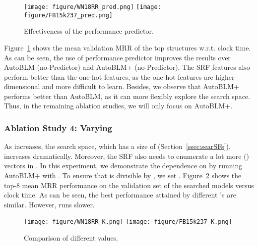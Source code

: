 \documentclass[10pt,journal,compsoc]{IEEEtran}
\begin{document}
\begin{figure}[ht]
	\centering
	\vspace{-5px}
	\texttt{[image: figure/WN18RR\_pred.png]}\hfill
	\texttt{[image: figure/FB15k237\_pred.png]}
	\vspace{-10px}
	\caption{Effectiveness of the performance predictor.}
	\vspace{-2px}
	\label{fig:predictor}
\end{figure}

Figure~\ref{fig:predictor} shows the mean validation MRR of the top 
structures w.r.t. clock time.
As can be seen,
the use of performance predictor improves the  results over
AutoBLM (no-Predictor) and AutoBLM+ (no-Predictor).
The SRF features also perform better than the one-hot features,
as the one-hot features are higher-dimensional and more difficult to learn.
Besides,
we observe that  
AutoBLM+ performs better than 
AutoBLM,
 as
it can 
more flexibly
explore  the search space.
Thus,
in the remaining ablation studies,
we will only focus on 
AutoBLM+.






\subsubsection{Ablation Study 4: Varying }
\label{sec:exp:varyK}

As  increases,
the search space, which has a size of 
(Section~\ref{ssec:searSFs}), increases dramatically.
Moreover, the SRF also needs to enumerate a lot more 
() vectors in .
In this experiment,
we demonstrate the dependence on  by running
AutoBLM+ with
.
To ensure that  is divisible by ,
we set .
Figure~\ref{fig:ks} shows
the top-8 mean MRR performance on the validation set of the searched models
versus clock time.
As can be seen, the best performance 
attained by different 's
are similar.
However,
 runs slower.

\begin{figure}[ht]
	\centering
	\vspace{-3px}
	\texttt{[image: figure/WN18RR\_K.png]}
	\hfill
	\texttt{[image: figure/FB15k237\_K.png]}
	
	\vspace{-10px}
	\caption{Comparison of different  values.}
	\vspace{-5px}
	\label{fig:ks}
\end{figure}
\end{document}
